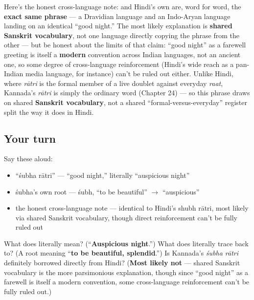 \begin{cousinweb}
Here's the honest cross-language note: \textbf{ } and Hindi's own \textbf{ } are, word for word, the \textbf{exact same phrase} — a Dravidian language and an Indo-Aryan language landing on an identical \textquotedblleft{}good night.\textquotedblright{} The most likely explanation is \textbf{shared Sanskrit vocabulary}, not one language directly copying the phrase from the other — but be honest about the limits of that claim: \textquotedblleft{}good night\textquotedblright{} as a farewell greeting is itself a \textbf{modern} convention across Indian languages, not an ancient one, so some degree of cross-language reinforcement (Hindi's wide reach as a pan-Indian media language, for instance) can't be ruled out either. Unlike Hindi, where \emph{rātri} is the formal member of a live doublet against everyday \emph{raat}, Kannada's \emph{rātri} is simply the ordinary word (Chapter 24) — so this phrase draws on shared \textbf{Sanskrit vocabulary}, not a shared \textquotedblleft{}formal-versus-everyday\textquotedblright{} register split the way it does in Hindi.
\end{cousinweb}

\subsection*{Your turn}
Say these aloud:

\begin{itemize}
\raggedright
  \item \textquotedblleft{}śubha rātri\textquotedblright{} — \textquotedblleft{}good night,\textquotedblright{} literally \textquotedblleft{}auspicious night\textquotedblright{}
  \item śubha's own root — śubh, \textquotedblleft{}to be beautiful\textquotedblright{} $\to$ \textquotedblleft{}auspicious\textquotedblright{}
  \item the honest cross-language note — identical to Hindi's shubh rātri, most likely via shared Sanskrit vocabulary, though direct reinforcement can't be fully ruled out
\end{itemize}

\begin{tcolorbox}[breakable,colback=teal!4,colframe=teal!35!black,title={Before you move on}]
What does \textbf{ } literally mean? (\textquotedblleft{}\textbf{Auspicious night}.\textquotedblright{}) What does \textbf{} literally trace back to? (A root meaning \textquotedblleft{}\textbf{to be beautiful, splendid}.\textquotedblright{}) Is Kannada's \emph{śubha rātri} definitely borrowed directly from Hindi? (\textbf{Most likely not} — shared Sanskrit vocabulary is the more parsimonious explanation, though since \textquotedblleft{}good night\textquotedblright{} as a farewell is itself a modern convention, some cross-language reinforcement can't be fully ruled out.)
\end{tcolorbox}
